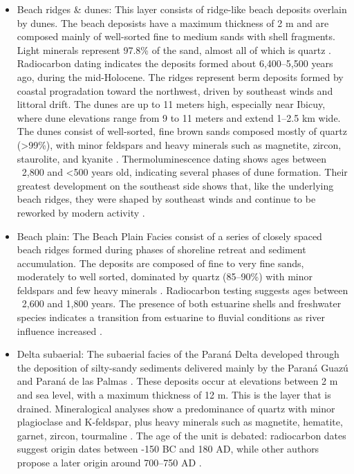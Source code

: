 \begin{itemize}
    \item Beach ridges \& dunes: This layer consists of ridge-like beach deposits overlain by dunes. The beach deposists have a maximum thickness of 2 m and are composed mainly of well-sorted fine to medium sands with shell fragments. Light minerals represent 97.8\% of the sand, almost all of which is quartz \autocite{cordiniContribucionConocimientoGeologia1949}. Radiocarbon dating indicates the deposits formed about 6,400–5,500 years ago, during the mid-Holocene. The ridges represent berm deposits formed by coastal progradation toward the northwest, driven by southeast winds and littoral drift.
    The dunes are up to 11 meters high, especially near Ibicuy, where dune elevations range from 9 to 11 meters and extend 1–2.5 km wide. The dunes consist of well-sorted, fine brown sands composed mostly of quartz (>99\%), with minor feldspars and heavy minerals such as magnetite, zircon, staurolite, and kyanite \autocite{cordiniContribucionConocimientoGeologia1949}. Thermoluminescence dating shows ages between ~2,800 and <500 years old, indicating several phases of dune formation. Their greatest development on the southeast side shows that, like the underlying beach ridges, they were shaped by southeast winds and continue to be reworked by modern activity \autocite{cavallottoEvolucionCambiosAmbientales2005}.

    \item Beach plain: The Beach Plain Facies consist of a series of closely spaced beach ridges formed during phases of shoreline retreat and sediment accumulation. The deposits are composed of fine to very fine sands, moderately to well sorted, dominated by quartz (85–90\%) with minor feldspars and few heavy minerals \autocite{cordiniContribucionConocimientoGeologia1949}. Radiocarbon testing suggests ages between ~2,600 and 1,800 years. The presence of both estuarine shells and freshwater species indicates a transition from estuarine to fluvial conditions as river influence increased \autocite{cavallottoEvolucionCambiosAmbientales2005}.

    \item Delta subaerial: The subaerial facies of the Paraná Delta developed through the deposition of silty-sandy sediments delivered mainly by the Paraná Guazú and Paraná de las Palmas \autocite{cavallottoEvolucionCambiosAmbientales2005}. These deposits occur at elevations between 2 m and sea level, with a maximum thickness of 12 m. This is the layer that is drained.
    Mineralogical analyses show a predominance of quartz with minor plagioclase and K-feldspar, plus heavy minerals such as magnetite, hematite, garnet, zircon, tourmaline \autocite{cavallottoEvolucionCambiosAmbientales2005}. The age of the unit is debated: radiocarbon dates suggest origin dates between -150 BC and 180 AD, while other authors propose a later origin around 700–750 AD \autocite{cavallottoEvolucionCambiosAmbientales2005}.
    

\end{itemize}
